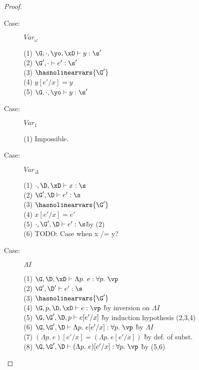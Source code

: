 \begin{proof}
\begin{description}
\item[Case:] $Var_\omega$
\begin{tabbing}
    (1) $\G, \cdot, \yo, \xD \vdash y : \s'$\\
    (2) $\G', \cdot \vdash e' : \s'$\\
    (3) $\hasnolinearvars{\G'}$\\
    (4) $y[e'/x] = y$\\
    (5) $\G, \cdot, \yo \vdash y : \s'$\\
\end{tabbing}

\item[Case:] $Var_1$
\begin{tabbing}
    (1) Impossible.
\end{tabbing}

\item[Case:] $Var_\Delta$
\begin{tabbing}
    (1) $\cdot, \D, \xD \vdash x : \s$\\
    (2) $\G', \D \vdash e' : \s$\\
    (3) $\hasnolinearvars{\G'}$\\
    (4) $x[e'/x] = e'$\\
    (5) $\cdot, \G', \D \vdash e' : \s$\` by (2)\\
    (6) TODO: Case when x /= y?\\
\end{tabbing}

\item[Case:] $\Lambda I$
\begin{tabbing}
    (1) $\G,\D, \xD \vdash \Lambda p.~e : \forall p.~\vp$\\
    (2) $\G', \D' \vdash e' : \s$\\
    (3) $\hasnolinearvars{\G'}$\\
    (4) $\G, p, \D, \xD \vdash e : \vp$ \` by inversion on $\Lambda I$\\
    (5) $\G, \G', \D, p \vdash e[e'/x]$ \` by induction hypothesis (2,3,4)\\
    (6) $\G, \G', \D \vdash \Lambda p.~e[e'/x] : \forall p.~\vp$ \` by $\Lambda I$ \\
    (7) $(\Lambda p.~e)[e'/x] = (\Lambda p.~e[e'/x])$ \` by def. of subst.\\
    (8) $\G, \G', \D \vdash (\Lambda p.~e)[e'/x] : \forall p.~\vp$ \` by (5,6)\\
\end{tabbing}


\end{description}
\end{proof}
